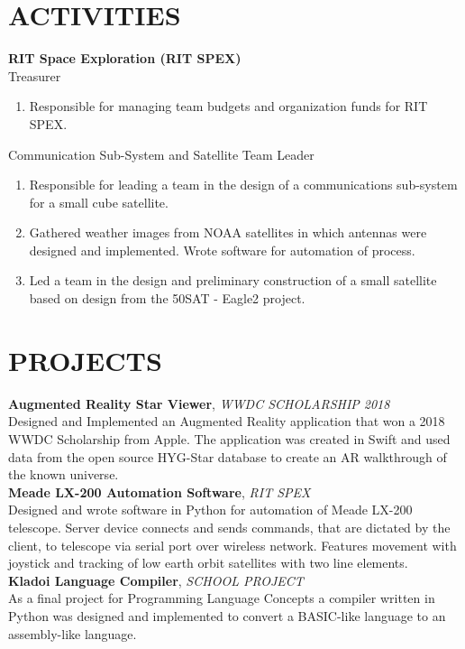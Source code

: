 \begin{resume}
\section{ACTIVITIES}
\textbf{RIT Space Exploration (RIT SPEX)}\\
Treasurer
      \begin{enumerate}
        \item[] Responsible for managing team budgets and organization funds for RIT SPEX.
      \end{enumerate}
      
Communication Sub-System and  Satellite Team Leader
      \begin{enumerate}
        \item[] Responsible for leading a team in the design of a communications sub-system for a small cube satellite.
        \item[] Gathered weather images from NOAA satellites in which antennas were designed and implemented. Wrote software for automation of process.
        \item[] Led a team in the design and preliminary construction of a small satellite based on design from the \textdollar 50SAT - Eagle2 project.
      \end{enumerate}
      
\section{PROJECTS}
\textbf{Augmented Reality Star Viewer}, \textit{WWDC SCHOLARSHIP 2018}\\
Designed and Implemented an Augmented Reality application that won a 2018 WWDC Scholarship from Apple.  The application was created in Swift and used data from the open source HYG-Star database to create an AR walkthrough of the known universe.
\\ [10pt]
\textbf{Meade LX-200 Automation Software}, \textit{RIT SPEX}\\
Designed and wrote software in Python for automation of Meade LX-200 telescope. Server device connects and sends commands, that are dictated by the client, to telescope via serial port over wireless network. Features movement with joystick and tracking of low earth orbit satellites with two line elements.
\\ [10pt]
\textbf{Kladoi Language Compiler}, \textit{SCHOOL PROJECT}\\
As a final project for Programming Language Concepts a compiler written in Python was designed and implemented to convert a BASIC-like language to an assembly-like language.




\end{resume}
